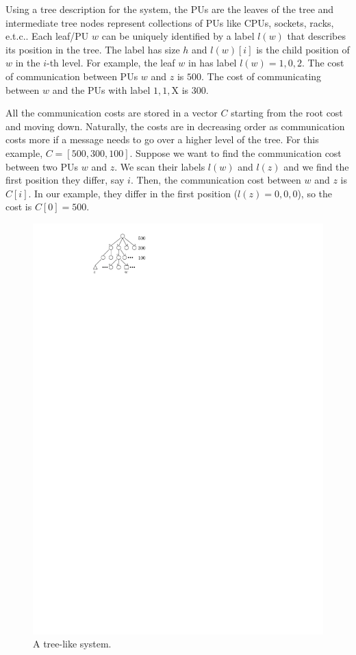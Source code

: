 \documentclass[a4paper,10pt]{article}
\newcommand{\etc}{e.t.c.\xspace}
\begin{document}
Using a tree description for the system, the PUs are the leaves of the tree and intermediate tree nodes
represent collections of PUs like CPUs, sockets, racks, \etc.
Each leaf/PU $w$ can be uniquely identified by a label $l(w)$ that describes its position in the tree.
The label has size $h$ and $l(w)[i]$ is the child position of $w$ in the $i$-th level.
For example, the leaf $w$ in  has label $l(w)=1,0,2$. 
The cost of communication between PUs $w$ and $z$ is $500$. The cost of communicating between $w$
and the PUs with label $1,1,\text{X}$ is $300$.

All the communication costs are stored in a vector $C$ starting from the root cost and moving down.
Naturally, the costs are in decreasing order as communication costs more if a message needs to 
go over a higher level of the tree.
For this example, $C=[500,300,100]$.
Suppose we want to find the communication cost between two PUs $w$ and $z$.
We scan their labels $l(w)$ and $l(z)$ and we find the first position they differ, say $i$.
Then, the communication cost between $w$ and $z$ is $C[i]$.  In our example, they differ in the 
first position ($l(z)=0,0,0$), so the cost is $C[0]=500$.

\begin{figure}
\centering
\includegraphics[scale=2]{hier_tree_system}
\caption{A tree-like system.}
\label{fig:tree}
\end{figure}
\end{document}
